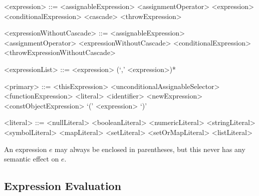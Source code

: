 \documentclass[makeidx]{article}
\begin{document}
{\begin{grammar}
<expression> ::= <assignableExpression> <assignmentOperator> <expression>
  \alt <conditionalExpression>
  \alt <cascade>
  \alt <throwExpression>

<expressionWithoutCascade> ::= \gnewline{}
  <assignableExpression> <assignmentOperator> <expressionWithoutCascade>
  \alt <conditionalExpression>
  \alt <throwExpressionWithoutCascade>

<expressionList> ::= <expression> (`,' <expression>)*

<primary> ::= <thisExpression>
  \alt \SUPER{} <unconditionalAssignableSelector>
  \alt <functionExpression>
  \alt <literal>
  \alt <identifier>
  \alt <newExpression>
  \alt <constObjectExpression>
  \alt `(' <expression> `)'

<literal> ::= <nullLiteral>
  \alt <booleanLiteral>
  \alt <numericLiteral>
  \alt <stringLiteral>
  \alt <symbolLiteral>
  \alt <mapLiteral>
  \alt <setLiteral>
  \alt <setOrMapLiteral>
  \alt <listLiteral>
\end{grammar}

\LMHash{}%
An expression $e$ may always be enclosed in parentheses, but this never has any semantic effect on $e$.



\subsection{Expression Evaluation}

}
\end{document}
